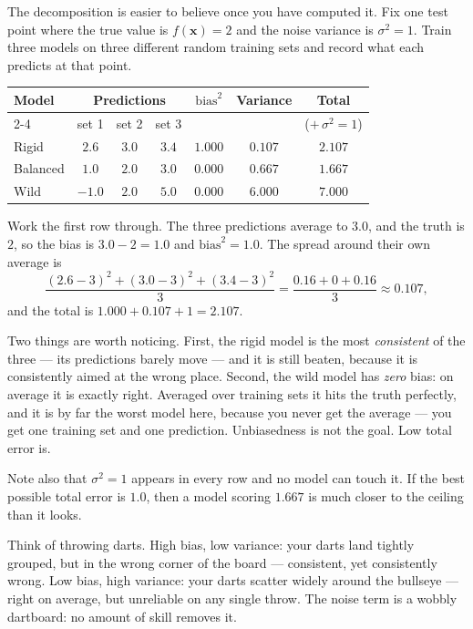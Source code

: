 \begin{workedexample}
The decomposition is easier to believe once you have computed it. Fix one test point where the true value is $f(\bm{x})=2$ and the noise variance is $\sigma^2=1$. Train three models on three different random training sets and record what each predicts at that point.

\begin{mltable}\small
\begin{tabular}{lcccccc}
\toprule
\rowcolor{MLPaleBlue!92}
Model & \multicolumn{3}{c}{Predictions} & $\text{bias}^2$ & Variance & Total \\
\cmidrule(lr){2-4}
 & set 1 & set 2 & set 3 & & & ($+\,\sigma^2=1$) \\
\midrule
Rigid    & $2.6$  & $3.0$ & $3.4$ & $1.000$ & $0.107$ & $\mathbf{2.107}$ \\
Balanced & $1.0$  & $2.0$ & $3.0$ & $0.000$ & $0.667$ & $\mathbf{1.667}$ \\
Wild     & $-1.0$ & $2.0$ & $5.0$ & $0.000$ & $6.000$ & $\mathbf{7.000}$ \\
\bottomrule
\end{tabular}
\end{mltable}

Work the first row through. The three predictions average to $3.0$, and the truth is $2$, so the bias is $3.0-2=1.0$ and $\text{bias}^2=1.0$. The spread around their own average is
\[
  \frac{{(2.6-3)}^2+{(3.0-3)}^2+{(3.4-3)}^2}{3}=\frac{0.16+0+0.16}{3}\approx 0.107,
\]
and the total is $1.000+0.107+1=2.107$.

Two things are worth noticing. First, the rigid model is the most \emph{consistent} of the three --- its predictions barely move --- and it is still beaten, because it is consistently aimed at the wrong place. Second, the wild model has \emph{zero} bias: on average it is exactly right. Averaged over training sets it hits the truth perfectly, and it is by far the worst model here, because you never get the average --- you get one training set and one prediction. Unbiasedness is not the goal. Low total error is.

Note also that $\sigma^2=1$ appears in every row and no model can touch it. If the best possible total error is $1.0$, then a model scoring $1.667$ is much closer to the ceiling than it looks.
\end{workedexample}

\begin{intuition}
Think of throwing darts. High bias, low variance: your darts land tightly grouped, but in the wrong corner of the board --- consistent, yet consistently wrong. Low bias, high variance: your darts scatter widely around the bullseye --- right on average, but unreliable on any single throw. The noise term is a wobbly dartboard: no amount of skill removes it.
\end{intuition}

